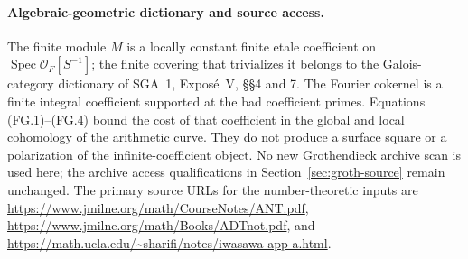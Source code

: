 \paragraph{Algebraic-geometric dictionary and source access.}
The finite module $M$ is a locally constant finite
etale coefficient on $\operatorname{Spec}\mathcal O_F[S^{-1}]$;
the finite covering that trivializes it belongs to the
Galois-category dictionary of SGA~1, Expos\'e~V,
\S\S4 and 7.  The Fourier cokernel is a finite integral
coefficient supported at the bad coefficient primes.
Equations (FG.1)--(FG.4) bound the cost of that coefficient
in the global and local cohomology of the arithmetic
curve.  They do not produce a surface square or a
polarization of the infinite-coefficient object.
No new Grothendieck archive scan is used here; the
archive access qualifications in Section~\ref{sec:groth-source}
remain unchanged.  The primary source URLs for the
number-theoretic inputs are
\url{https://www.jmilne.org/math/CourseNotes/ANT.pdf},
\url{https://www.jmilne.org/math/Books/ADTnot.pdf}, and
\url{https://math.ucla.edu/~sharifi/notes/iwasawa-app-a.html}.
